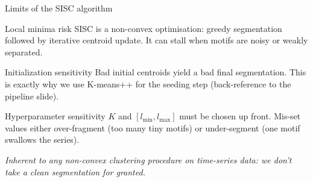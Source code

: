 \begin{frame}{Limits of the SISC algorithm}
\begin{block}{Local minima risk}
SISC is a non-convex optimisation: greedy segmentation followed by iterative centroid update. It can stall when motifs are noisy or weakly separated.
\end{block}

\begin{block}{Initialization sensitivity}
Bad initial centroids yield a bad final segmentation. This is exactly why we use K-means++ for the seeding step (back-reference to the pipeline slide).
\end{block}

\begin{alertblock}{Hyperparameter sensitivity}
$K$ and $[l_{\min},l_{\max}]$ must be chosen up front. Mis-set values either over-fragment (too many tiny motifs) or under-segment (one motif swallows the series).
\end{alertblock}

\medskip
\centering\footnotesize\emph{Inherent to any non-convex clustering procedure on time-series data: we don't take a clean segmentation for granted.}
\end{frame}
